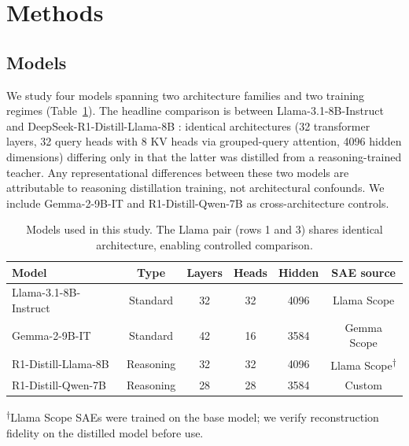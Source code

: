 
\section{Methods}
\label{sec:methods}

\subsection{Models}
\label{sec:models}

We study four models spanning two architecture families and two training
regimes (Table~\ref{tab:models}).  The headline comparison is between
Llama-3.1-8B-Instruct \citep{llama31} and DeepSeek-R1-Distill-Llama-8B
\citep{deepseekr1}: identical architectures (32 transformer layers, 32
query heads with 8 KV heads via grouped-query attention, 4096 hidden
dimensions) differing only in that the latter was distilled from a
reasoning-trained teacher.  Any representational differences between these
two models are attributable to reasoning distillation training, not
architectural confounds.  We include Gemma-2-9B-IT \citep{gemma2} and
R1-Distill-Qwen-7B \citep{deepseekr1} as cross-architecture controls.

\begin{table}[t]
\centering
\caption{Models used in this study.  The Llama pair (rows 1 and 3) shares
  identical architecture, enabling controlled comparison.}
\label{tab:models}
\vspace{4pt}
\small
\begin{tabular}{lccccc}
\toprule
\textbf{Model} & \textbf{Type} & \textbf{Layers} & \textbf{Heads} & \textbf{Hidden} & \textbf{SAE source} \\
\midrule
Llama-3.1-8B-Instruct & Standard & 32 & 32 & 4096 & Llama Scope \\
Gemma-2-9B-IT & Standard & 42 & 16 & 3584 & Gemma Scope \\
R1-Distill-Llama-8B & Reasoning & 32 & 32 & 4096 & Llama Scope\textsuperscript{$\dagger$} \\
R1-Distill-Qwen-7B & Reasoning & 28 & 28 & 3584 & Custom \\
\bottomrule
\end{tabular}
\vspace{2pt}
\raggedright
\footnotesize{\textsuperscript{$\dagger$}Llama Scope SAEs were trained on the
base model; we verify reconstruction fidelity on the distilled model before
use.}
\end{table}

